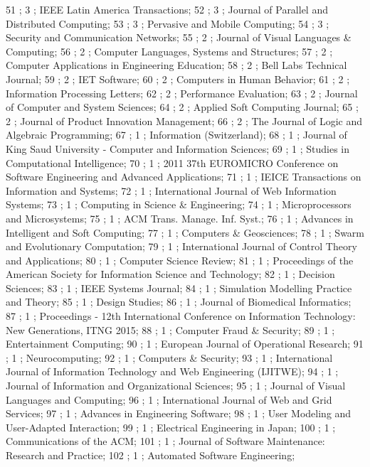 51 ; 3 ; IEEE Latin America Transactions; 
52 ; 3 ; Journal of Parallel and Distributed Computing; 
53 ; 3 ; Pervasive and Mobile Computing; 
54 ; 3 ; Security and Communication Networks; 
55 ; 2 ; Journal of Visual Languages {\&} Computing; 
56 ; 2 ; Computer Languages, Systems and Structures; 
57 ; 2 ; Computer Applications in Engineering Education; 
58 ; 2 ; Bell Labs Technical Journal; 
59 ; 2 ; IET Software; 
60 ; 2 ; Computers in Human Behavior; 
61 ; 2 ; Information Processing Letters; 
62 ; 2 ; Performance Evaluation; 
63 ; 2 ; Journal of Computer and System Sciences; 
64 ; 2 ; Applied Soft Computing Journal; 
65 ; 2 ; Journal of Product Innovation Management; 
66 ; 2 ; The Journal of Logic and Algebraic Programming; 
67 ; 1 ; Information (Switzerland); 
68 ; 1 ; Journal of King Saud University - Computer and Information Sciences; 
69 ; 1 ; Studies in Computational Intelligence; 
70 ; 1 ; 2011 37th EUROMICRO Conference on Software Engineering and Advanced Applications; 
71 ; 1 ; IEICE Transactions on Information and Systems; 
72 ; 1 ; International Journal of Web Information Systems; 
73 ; 1 ; Computing in Science {\&} Engineering; 
74 ; 1 ; Microprocessors and Microsystems; 
75 ; 1 ; ACM Trans. Manage. Inf. Syst.; 
76 ; 1 ; Advances in Intelligent and Soft Computing; 
77 ; 1 ; Computers {\&} Geosciences; 
78 ; 1 ; Swarm and Evolutionary Computation; 
79 ; 1 ; International Journal of Control Theory and Applications; 
80 ; 1 ; Computer Science Review; 
81 ; 1 ; Proceedings of the American Society for Information Science and Technology; 
82 ; 1 ; Decision Sciences; 
83 ; 1 ; IEEE Systems Journal; 
84 ; 1 ; Simulation Modelling Practice and Theory; 
85 ; 1 ; Design Studies; 
86 ; 1 ; Journal of Biomedical Informatics; 
87 ; 1 ; Proceedings - 12th International Conference on Information Technology: New Generations, ITNG 2015; 
88 ; 1 ; Computer Fraud {\&} Security; 
89 ; 1 ; Entertainment Computing; 
90 ; 1 ; European Journal of Operational Research; 
91 ; 1 ; Neurocomputing; 
92 ; 1 ; Computers {\&} Security; 
93 ; 1 ; International Journal of Information Technology and Web Engineering (IJITWE); 
94 ; 1 ; Journal of Information and Organizational Sciences; 
95 ; 1 ; Journal of Visual Languages and Computing; 
96 ; 1 ; International Journal of Web and Grid Services; 
97 ; 1 ; Advances in Engineering Software; 
98 ; 1 ; User Modeling and User-Adapted Interaction; 
99 ; 1 ; Electrical Engineering in Japan; 
100 ; 1 ; Communications of the ACM; 
101 ; 1 ; Journal of Software Maintenance: Research and Practice; 
102 ; 1 ; Automated Software Engineering; 
